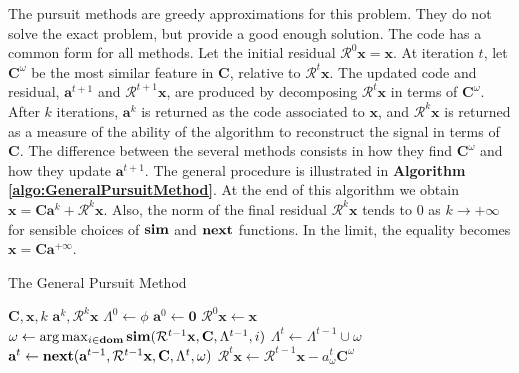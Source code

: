 \documentclass[12pt,a4paper,oneside,english]{UPBThesis}
\newcommand{\hcrange}[2]{\overline{{#1}\colon\!\!{#2}}}
\begin{document}
The pursuit methods are greedy approximations for this problem. They do not solve the exact problem, but provide a good enough solution. The code has a common form for all methods. Let the initial residual $\mathcal{R}^0\textbf{x} = \textbf{x}$. At iteration $t$, let $\textbf{C}^\omega$ be the most similar feature in $\textbf{C}$, relative to $\mathcal{R}^t\textbf{x}$. The updated code and residual, $\textbf{a}^{t+1}$ and $\mathcal{R}^{t+1}\textbf{x}$, are produced by decomposing $\mathcal{R}^t\textbf{x}$ in terms of $\textbf{C}^\omega$. After $k$ iterations, $\textbf{a}^k$ is returned as the code associated to $\textbf{x}$, and $\mathcal{R}^k\textbf{x}$ is returned as a measure of the ability of the algorithm to reconstruct the signal in terms of $\textbf{C}$. The difference between the several methods consists in how they find $\textbf{C}^\omega$ and how they update $\textbf{a}^{t+1}$. The general procedure is illustrated in \textbf{Algorithm \ref{algo:GeneralPursuitMethod}}. At the end of this algorithm we obtain $\textbf{x} = \textbf{C}\textbf{a}^k + \mathcal{R}^k\textbf{x}$. Also, the norm of the final residual $\mathcal{R}^k\textbf{x}$ tends to $0$ as $k \rightarrow +\infty$ for sensible choices of $\text{\textbf{sim}}$ and $\text{\textbf{next}}$ functions. In the limit, the equality becomes $\textbf{x} = \textbf{C}\textbf{a}^{+\infty}$.

\begin{algorithm}
\caption{The General Pursuit Method}
\label{algo:GeneralPursuitMethod}
\begin{algorithmic}
\Require $\textbf{C},\textbf{x},k$
\Ensure $\textbf{a}^k,\mathcal{R}^k\textbf{x}$
\State $\Lambda^0 \gets \phi$
\State $\textbf{a}^0 \gets \textbf{0}$
\State $\mathcal{R}^0\textbf{x} \gets \textbf{x}$
\For {$t = \hcrange{1}{k}$}
\State $\omega \gets \arg \max_{i \in \textbf{dom}} \text{\textbf{sim}}(\mathcal{R}^{t-1}\textbf{x},\textbf{C},\Lambda^{t-1},i)$
\State $\Lambda^t \gets \Lambda^{t-1} \cup \omega$
\State $\textbf{a}^t \gets \text{\textbf{next}}(\textbf{a}^{t-1},\mathcal{R}^{t-1}\textbf{x},\textbf{C},\Lambda^t,\omega)$
\State $\mathcal{R}^t\textbf{x} \gets \mathcal{R}^{t-1}\textbf{x} - a_\omega^t\textbf{C}^\omega$
\EndFor
\end{algorithmic}
\end{algorithm}
\end{document}
